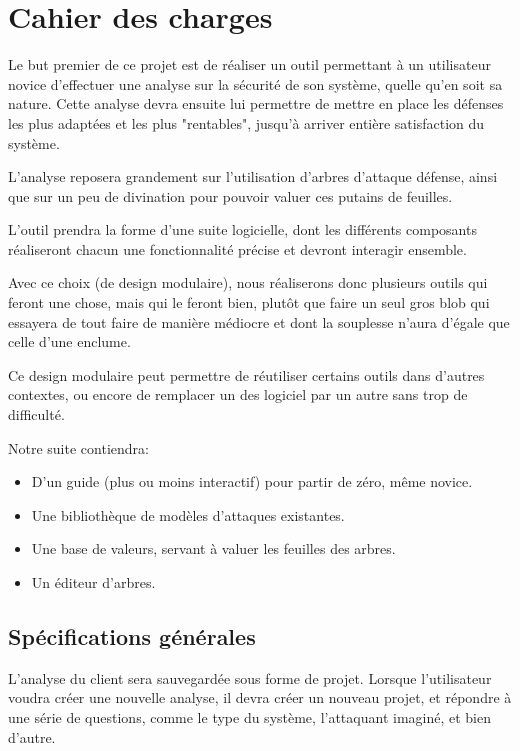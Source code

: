 \chapter{Cahier des charges}
    Le but premier de ce projet est de réaliser un outil permettant à un utilisateur novice d'effectuer une analyse sur la sécurité de son système, quelle qu'en soit sa nature. Cette analyse devra ensuite lui permettre de mettre en place les défenses les plus adaptées et les plus "rentables", jusqu'à arriver entière satisfaction du système.
    
    L'analyse reposera grandement sur l'utilisation d'arbres d'attaque défense, ainsi que sur un peu de divination pour pouvoir valuer ces putains de feuilles.
    
    L'outil prendra la forme d'une suite logicielle, dont les différents composants réaliseront chacun une fonctionnalité précise et devront interagir ensemble.
    
    Avec ce choix (de design modulaire), nous réaliserons donc plusieurs outils qui feront une chose, mais qui le feront bien, plutôt que faire un seul gros blob qui essayera de tout faire de manière médiocre et dont la souplesse n'aura d'égale que celle d'une enclume.
    
    Ce design modulaire peut permettre de réutiliser certains outils dans d'autres contextes, ou encore de remplacer un des logiciel par un autre sans trop de difficulté. 
    
    Notre suite contiendra:
    \begin{itemize}
        \item D'un guide (plus ou moins interactif) pour partir de zéro, même novice.
    	\item Une bibliothèque de modèles d'attaques existantes.
        \item Une base de valeurs, servant à valuer les feuilles des arbres.
        \item Un éditeur d'arbres.
    \end{itemize}
    
    \section{Spécifications générales}
        L'analyse du client sera sauvegardée sous forme de projet. Lorsque l'utilisateur voudra créer une nouvelle analyse, il devra créer un nouveau projet, et répondre à une série de questions, comme le type du système, l'attaquant imaginé, et bien d'autre.
        
